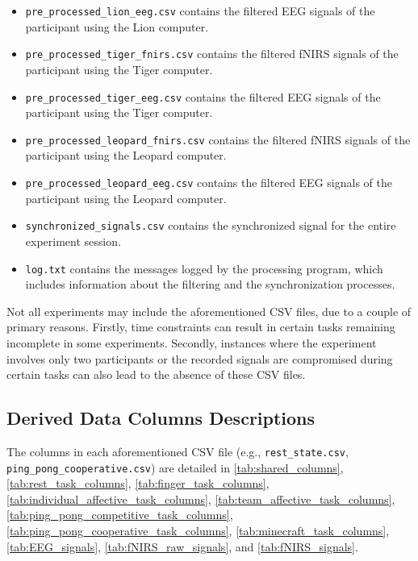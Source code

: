 \begin{itemize}
  \item \texttt{pre\_processed\_lion\_eeg.csv}  contains the filtered EEG signals of the participant using the Lion computer.
  \item \texttt{pre\_processed\_tiger\_fnirs.csv}  contains the filtered fNIRS signals of the participant using the Tiger computer.
  \item \texttt{pre\_processed\_tiger\_eeg.csv}  contains the filtered EEG signals of the participant using the Tiger computer.
  \item \texttt{pre\_processed\_leopard\_fnirs.csv}  contains the filtered fNIRS signals of the participant using the Leopard computer.
  \item \texttt{pre\_processed\_leopard\_eeg.csv}  contains the filtered EEG signals of the participant using the Leopard computer.
  \item \texttt{synchronized\_signals.csv} contains the synchronized signal for the entire experiment session.
  \item \texttt{log.txt} contains the messages logged by the processing program, which includes information about the filtering and the synchronization processes.
\end{itemize}

Not all experiments may include the aforementioned CSV files, due to a couple of primary reasons. Firstly, time constraints can result in certain tasks remaining incomplete in some experiments. Secondly, instances where the experiment involves only two participants or the recorded signals are compromised during certain tasks can also lead to the absence of these CSV files.

\subsection{Derived Data Columns Descriptions}
\label{sec:derived_data_cols_desc}

The columns in each aforementioned CSV file (e.g., \texttt{rest\_state.csv}, \texttt{ping\_pong\_cooperative.csv}) are detailed in \autoref{tab:shared_columns}, \autoref{tab:rest_task_columns}, \autoref{tab:finger_task_columns}, \autoref{tab:individual_affective_task_columns}, \autoref{tab:team_affective_task_columns}, \autoref{tab:ping_pong_competitive_task_columns}, \autoref{tab:ping_pong_cooperative_task_columns}, \autoref{tab:minecraft_task_columns}, \autoref{tab:EEG_signals}, \autoref{tab:fNIRS_raw_signals}, and \autoref{tab:fNIRS_signals}.

